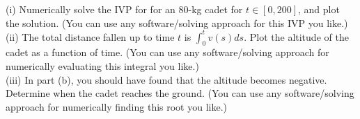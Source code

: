 \documentclass[11pt]{article}
\begin{document}
\noindent (i) Numerically solve the IVP for 
 for an 80-kg cadet for $t\in [0,200]$, and plot the solution. (You can use any software/solving approach for this IVP you like.)\\

\noindent (ii) The total distance fallen up to time $t$
 is 
 $\int_0^t v(s)ds.$
 Plot the altitude of the cadet as a function of time. (You can use any software/solving approach for numerically evaluating this integral you like.)\\

\noindent (iii) In part (b), you should have found that the altitude becomes negative. Determine when the cadet reaches the ground. (You can use any software/solving approach for numerically finding this root you like.)
\end{document}
